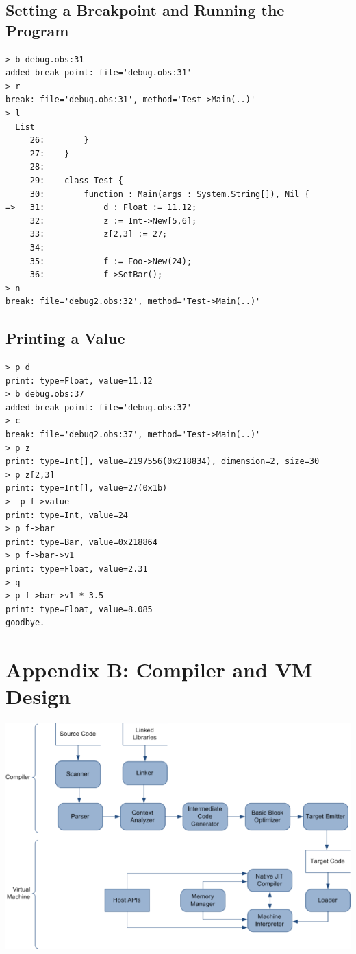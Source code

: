 \documentclass[12pt]{article}
\begin{document}
\subsection{Setting a Breakpoint and Running the Program}
\begin{verbatim}
> b debug.obs:31
added break point: file='debug.obs:31'
> r
break: file='debug.obs:31', method='Test->Main(..)'
> l
  List
     26: 		}
     27: 	}
     28: 
     29: 	class Test {
     30: 		function : Main(args : System.String[]), Nil {
=>   31: 			d : Float := 11.12;
     32: 			z := Int->New[5,6];	
     33: 			z[2,3] := 27;
     34: 
     35: 			f := Foo->New(24);
     36: 			f->SetBar();
> n
break: file='debug2.obs:32', method='Test->Main(..)'
\end{verbatim}

\subsection{Printing a Value}
\begin{verbatim}
> p d
print: type=Float, value=11.12
> b debug.obs:37
added break point: file='debug.obs:37'
> c
break: file='debug2.obs:37', method='Test->Main(..)'
> p z
print: type=Int[], value=2197556(0x218834), dimension=2, size=30
> p z[2,3]
print: type=Int[], value=27(0x1b)
>  p f->value
print: type=Int, value=24
> p f->bar
print: type=Bar, value=0x218864
> p f->bar->v1
print: type=Float, value=2.31
> q
> p f->bar->v1 * 3.5
print: type=Float, value=8.085
goodbye.
\end{verbatim}

\section{Appendix B: Compiler and VM Design}
\includegraphics[scale=0.60]{../images/compiler_data_flow.png}
\end{document}
